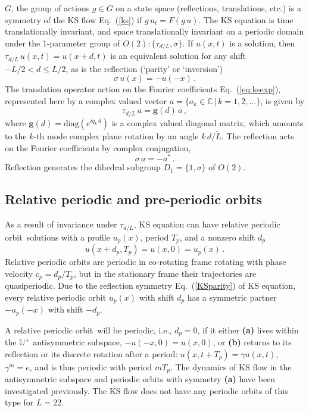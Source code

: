 \documentclass[aip,cha,showpacs,reprint]{revtex4-1} %
\newcommand{\beq}{\begin{equation}}
\newcommand{\eeq}{\end{equation}}
\newcommand{\rf}     [1] {\cite{#1}}
\newcommand{\refeq}  [1] {Eq.~(\ref{#1})}                   %
\newcommand{\etc}{{etc.}}
\newcommand{\ie}{{i.e.}}
\newcommand{\Refl}{\ensuremath{\sigma}}
\newcommand{\bbU}{\mathbb{U}}
\newcommand{\po}{periodic orbit}
\newcommand{\rpo}{rela\-ti\-ve periodic orbit}
\newcommand{\Rpo}{Rela\-ti\-ve periodic orbit}
\newcommand{\period}[1]{{\ensuremath{T_{#1}}}}
\newcommand{\Shift}{\ensuremath{\tau}}
\newcommand{\shift}{\ensuremath{d}}
\newcommand{\velRel}{\ensuremath{c}}    %
\begin{document}
$G$, the group of actions $ g \in G $ on a
state space (reflections, translations, \etc) is a symmetry of the KS
flow \refeq{ks} if $g\,u_t = F(g\,u)$.
The KS equation is time translationally invariant, and space translationally invariant
on a periodic domain under
the 1-parameter group of
$O(2): \{\Shift_{\shift/L},\Refl \}$.
If $u(x,t)$ is a solution, then
$\Shift_{\shift/L}\, u(x,t) = u(x+\shift,t)$
is an equivalent solution for any shift
$-L/2 < \shift \leq L/2$,
as is the
reflection (`parity' or `inversion')
\beq
    \Refl \, u(x) = -u(-x)
\,.
\label{KSparity}
\eeq
The translation operator action on the Fourier coefficients \refeq{eq:ksexp},
represented here by a complex valued vector
$a = \{a_k\in\mathbb{C}\,|\,k = 1, 2, \ldots\}$, is given by
\beq
  \Shift_{\shift/L}\, a = \mathbf{g}(\shift) \, a \,,
\label{eq:shiftFour}
\eeq
where $\mathbf{g}(\shift) = \mbox{diag}( e^{i q_k\, \shift} )$ is a complex
valued diagonal matrix, which amounts to the $k$-th mode complex plane
rotation by an angle $k\, \shift /\tilde{L}$.  The reflection acts on
the Fourier coefficients by complex conjugation,
\beq
  \Refl \, a = -a^\ast
\,.
\label{FModInvSymm}
\eeq
Reflection generates the dihedral subgroup $D_1 = \{1, \Refl\}$
of $O(2)$.

\subsection{Relative periodic and pre-periodic orbits}
\label{s:rpoNumerics}

As a result of invariance under $\Shift_{\shift/L}$,
KS equation can have \rpo\ solutions
with a profile $u_p(x)$, period $\period{p}$, and a
nonzero shift $\shift_p$
\beq
  u(x+\shift_p,\period{p}) = u(x,0) = u_p(x)
\,.
\label{eq:KSrpos}
\eeq
{\Rpo s} are periodic in
co-rotating frame rotating with phase velocity
$\velRel_p=\shift_p/\period{p}$, but in the stationary frame
their trajectories are quasiperiodic.  Due to the reflection symmetry
\refeq{KSparity} of KS equation, every {\rpo} $u_p(x)$ with shift
$\shift_p$ has a symmetric partner $-u_p(-x)$ with shift $-\shift_p$.

A \rpo\ will be periodic, \ie, $\shift_p = 0$, if it either {\bf (a)}
lives within the $\bbU^+$ antisymmetric subspace, $-u(-x,0) = u(x,0)$, or
{\bf (b)} returns to its reflection or its discrete rotation after a
period: $u(x,t+\period{p})=\gamma u(x,t)$, $\gamma^m=e$, and is thus
periodic with period $m\period{p}$. The dynamics of KS flow in the
antisymmetric subspace and \po s with symmetry {\bf (a)} have been
investigated previously\rf{Christiansen97,LanThesis,lanCvit07}. The KS
flow does not have any periodic orbits of this type for $L = 22$.
\end{document}
